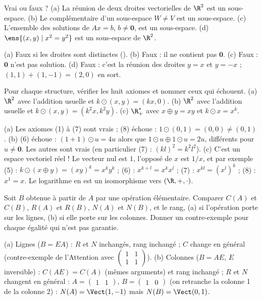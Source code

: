 \begin{exo}
Vrai ou faux ? (a) La réunion de deux droites vectorielles de $\R^2$ est un sous-espace. (b) Le complémentaire d'un sous-espace $W\neq V$ est un sous-espace. (c) L'ensemble des solutions de $Ax=b$, $b\neq\mathbf 0$, est un sous-espace. (d) $\ens{(x,y)\mid x^2=y^2}$ est un sous-espace de $\R^2$.
\begin{corrige}
(a) Faux si les droites sont distinctes (). (b) Faux : il ne contient pas $\mathbf 0$. (c) Faux : $\mathbf 0$ n'est pas solution. (d) Faux : c'est la réunion des droites $y=x$ et $y=-x$ ; $(1,1)+(1,-1)=(2,0)$ en sort.
\end{corrige}
\end{exo}
\begin{exo}
Pour chaque structure, vérifier les huit axiomes et nommer ceux qui échouent.
(a) $\R^2$ avec l'addition usuelle et $k\odot(x,y)=(kx,0)$.
(b) $\R^2$ avec l'addition usuelle et $k\odot(x,y)=(k^2x,k^2y)$.
(c) $\R_+^*$ avec $x\oplus y=xy$ et $k\odot x=x^k$.
\begin{corrige}
(a) Les axiomes (1) à (7) sont vrais ; (8) échoue : $1\odot(0,1)=(0,0)\neq(0,1)$.
(b) (6) échoue : $(1+1)\odot u=4u$ alors que $1\odot u\oplus1\odot u=2u$, différents pour $u\neq\mathbf 0$. Les autres sont vrais (en particulier (7) : $(kl)^2=k^2l^2$).
(c) C'est un espace vectoriel réel ! Le \og vecteur nul \fg{} est $1$, l'opposé de $x$ est $1/x$, et par exemple (5) : $k\odot(x\oplus y)=(xy)^k=x^ky^k$ ; (6) : $x^{k+l}=x^kx^l$ ; (7) : $x^{kl}=(x^l)^k$ ; (8) : $x^1=x$. Le logarithme en est un isomorphisme vers $(\R,+,\cdot)$.
\end{corrige}
\end{exo}
\begin{exo}
Soit $B$ obtenue à partir de $A$ par une opération élémentaire. Comparer $C(A)$ et $C(B)$, $R(A)$ et $R(B)$, $N(A)$ et $N(B)$, et le rang, (a) si l'opération porte sur les lignes, (b) si elle porte sur les colonnes. Donner un contre-exemple pour chaque égalité qui n'est pas garantie.
\begin{corrige}
(a) Lignes ($B=EA$) : $R$ et $N$ inchangés, rang inchangé ; $C$ change en général (contre-exemple de l'Attention avec $\begin{pmatrix}1&1\\1&1\end{pmatrix}$). (b) Colonnes ($B=AE$, $E$ inversible) : $C(AE)=C(A)$ (mêmes arguments) et rang inchangé ; $R$ et $N$ changent en général : $A=\begin{pmatrix}1&1\end{pmatrix}$, $B=\begin{pmatrix}1&0\end{pmatrix}$ (on retranche la colonne 1 de la colonne 2) : $N(A)=\Vect(1,-1)$ mais $N(B)=\Vect(0,1)$.
\end{corrige}
\end{exo}
